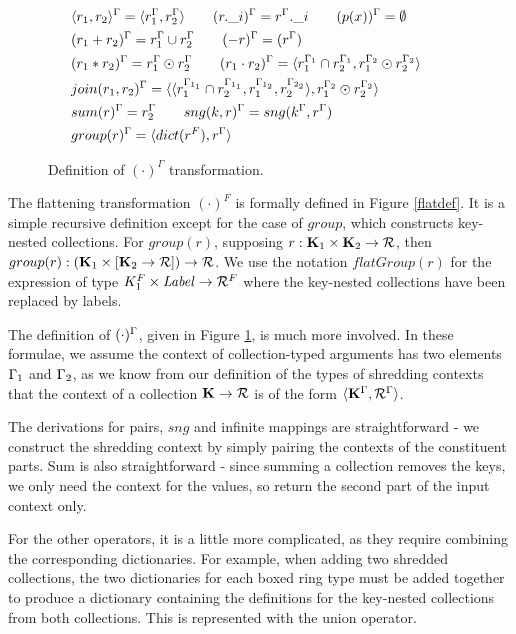 {{{\begin{figure}
\begin{equation*}
\begin{aligned}
&\langle r_1, r_2 \rangle^\Gamma = \langle r_1^\Gamma, r_2^\Gamma \rangle \qquad (r.\_i)^\Gamma = r^\Gamma.\_i  \qquad (p(x))^\Gamma = \emptyset \\
&(r_1 + r_2)^\Gamma = r_1^\Gamma \cup r_2^\Gamma \qquad (-r)^\Gamma = (r^\Gamma) \\
&(r_1*r_2)^\Gamma = r_1^\Gamma \odot r_2^\Gamma \qquad (r_1 \cdot r_2)^\Gamma = \langle r_1^{\Gamma_1} \cap r_2^{\Gamma_1}, r_1^{\Gamma_2} \odot r_2^{\Gamma_2} \rangle  \\
&join(r_1,r_2)^\Gamma = \langle \langle r_1^{\Gamma_{1_1}} \cap r_2^{\Gamma_{1_1}}, r_1^{\Gamma_{1_2}},r_2^{\Gamma_{2_2}} \rangle, r_1^{\Gamma_2} \odot r_2^{\Gamma_2} \rangle \\&sum(r)^\Gamma = r^\Gamma_2 \qquad sng(k,r)^\Gamma = sng(k^\Gamma,r^\Gamma) \\
&group(r)^\Gamma = \langle dict(r^F), r^\Gamma \rangle \\
\end{aligned}
\qquad
\end{equation*}
\caption{Definition of $(\cdot)^\Gamma $ transformation.}
\label{contextdef}
\end{figure}

The flattening transformation $(\cdot)^F$ is formally defined in Figure \ref{flatdef}. It is a simple recursive definition except for the case of $group$, which constructs key-nested collections. For $group(r)$, supposing $r: \mathbf{K}_1 \times \mathbf{K}_2 \rightarrow \mathcal{R}$, then $group(r): (\mathbf{K}_1 \times [\mathbf{K}_2 \rightarrow \mathcal{R}]) \rightarrow \mathcal{R}$. We use the notation $flatGroup(r)$ for the expression of type $K_1^F\times \textrm{\textit{Label}} \rightarrow \mathcal{R}^F$ where the key-nested collections have been replaced by labels.

The definition of $(\cdot)^\Gamma$, given in Figure \ref{contextdef}, is much more involved. In these formulae, we assume the context of collection-typed arguments has two elements $\Gamma_1$ and $\Gamma_2$, as we know from our definition of the types of shredding contexts that the context of a collection $\mathbf{K} \rightarrow \mathcal{R}$ is of the form $\langle \mathbf{K}^\Gamma, \mathcal{R}^\Gamma \rangle$.

The derivations for pairs, $sng$ and infinite mappings are straightforward - we construct the shredding context by simply pairing the contexts of the constituent parts. Sum is also straightforward - since summing a collection removes the keys, we only need the context for the values, so return the second part of the input context only.

For the other operators, it is a little more complicated, as they require combining the corresponding dictionaries. For example, when adding two shredded collections, the two dictionaries for each boxed ring type must be added together to produce a dictionary containing the definitions for the key-nested collections from both collections. This is represented with the union operator.

}}}
